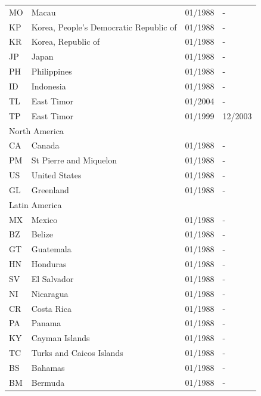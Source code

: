 \begin{footnotesize}
\begin{longtable}{lp{8cm}p{2cm}p{2cm}}
	MO & Macau                                  & 01/1988 & -  \\
	KP & Korea, People's Democratic Republic of & 01/1988 & -  \\
	KR & Korea, Republic of                     & 01/1988 & -  \\
	JP & Japan                                  & 01/1988 & -  \\
	PH & Philippines                            & 01/1988 & -  \\
	ID & Indonesia                              & 01/1988 & -  \\
	TL & East Timor                             & 01/2004 & -  \\
	TP & East Timor                             & 01/1999 & 12/2003  \\
	\midrule
	\multicolumn{3}{l}{North America}  &  \\
	CA & Canada                 & 01/1988 & -  \\
	PM & St Pierre and Miquelon & 01/1988 & -  \\
	US & United States          & 01/1988 & -  \\
	GL & Greenland              & 01/1988 & -  \\
	\midrule
	\multicolumn{3}{l}{Latin America}  &  \\
	MX & Mexico                                   & 01/1988 & -  \\
	BZ & Belize                                   & 01/1988 & -  \\
	GT & Guatemala                                & 01/1988 & -  \\
	HN & Honduras                                 & 01/1988 & -  \\
	SV & El Salvador                              & 01/1988 & -  \\
	NI & Nicaragua                                & 01/1988 & -  \\
	CR & Costa Rica                               & 01/1988 & -  \\
	PA & Panama                                   & 01/1988 & -  \\
	KY & Cayman Islands                           & 01/1988 & -  \\
	TC & Turks and Caicos Islands                 & 01/1988 & -  \\
	BS & Bahamas                                  & 01/1988 & -  \\
	BM & Bermuda                                  & 01/1988 & -  \\

\end{longtable}
\end{footnotesize}
